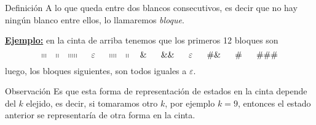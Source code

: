 \begin{frame}
	\begin{block}{Definición}
		\PN A lo que queda entre dos blancos consecutivos, es decir que no hay ningún blanco entre ellos, lo llamaremos
		\textit{bloque}.
	\end{block}

	\vspace{3mm}
	\PN \underline{\textbf{Ejemplo:}} en la cinta de arriba tenemos que los primeros 12 bloques son
	\begin{equation*}
		\shortmid \shortmid \shortmid \ \ \ \shortmid \shortmid \ \ \ \shortmid \shortmid \shortmid \shortmid \shortmid \ \
		\ \ \varepsilon \ \ \ \ \shortmid \shortmid \shortmid \shortmid \ \ \ \shortmid \shortmid \ \ \ \& \ \ \ \ \ \&\& \
		\ \ \ \ \varepsilon \ \ \ \ \ \#\& \ \ \ \ \ \# \ \ \ \ \ \#\#\#
	\end{equation*}
	\PN luego, los bloques siguientes, son todos iguales a $\varepsilon$.

	\begin{alertblock}{Observación}
		\PN Es que esta forma de representación de estados en la cinta depende del $k$ elejido, es decir, si tomaramos otro
		$k$, por ejemplo $k=9$, entonces el estado anterior se representaría de otra forma en la cinta.
	\end{alertblock}
\end{frame}
